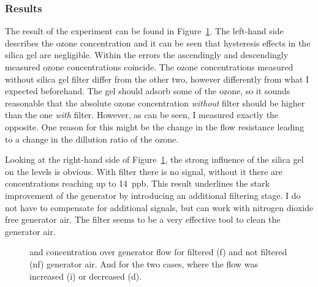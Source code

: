 \subsubsection{Results}
\label{sec:silica-results}

The result of the experiment can be found in
Figure~\ref{fig:o3-flow}. The left-hand side describes the ozone
concentration and it can be seen that hysteresis effects in the silica
gel are negligible. Within the errors the ascendingly and descendingly
measured ozone concentrations coincide. The ozone concentrations
measured without silica gel filter differ from the other two, however
differently from what I expected beforehand. The gel should adsorb
some of the ozone, so it sounds reasonable that the absolute ozone
concentration \emph{without} filter should be higher than the one
\emph{with} filter. However, as can be seen, I measured exactly the
opposite. One reason for this might be the change in the flow
resistance leading to a change in the dillution ratio of the ozone.

Looking at the right-hand side of Figure~\ref{fig:o3-flow}, the
strong influence of the silica gel on the  levels is obvious. With
filter there is no  signal, without it there are concentrations
reaching up to \SI{14}{ppb}. This result underlines the stark
improvement of the generator by introducing an additional filtering
stage. I do not have to compensate for additional  signals,
but can work with nitrogen dioxide free generator air. The filter
seems to be a very effective tool to clean the generator air.

\begin{figure}[htbp]
  \centering
  
  \hfill
  
  \caption{ and  concentration over generator flow for
    filtered (f) and not filtered (nf) generator air. And for the two
    cases, where the flow was increased (i) or decreased (d).}
  \label{fig:o3-flow}
\end{figure}

